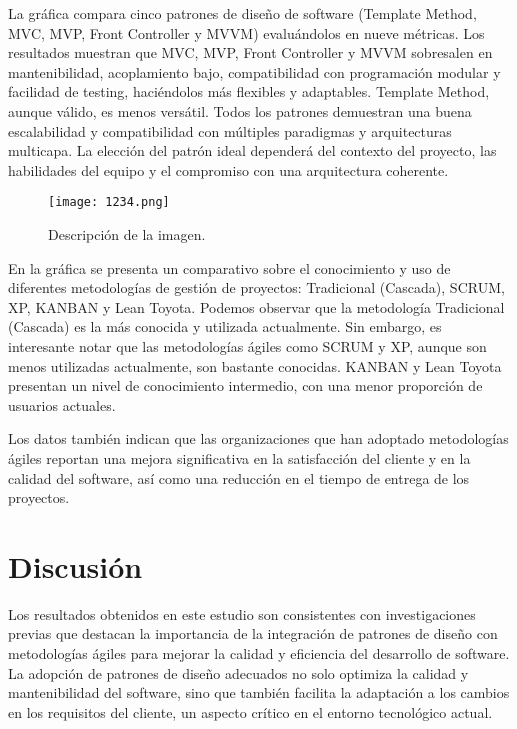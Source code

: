 \documentclass[twocolumn]{article}
\begin{document}
La gráfica compara cinco patrones de diseño de software (Template Method, MVC, MVP, Front Controller y MVVM) evaluándolos en nueve métricas. Los resultados muestran que MVC, MVP, Front Controller y MVVM sobresalen en mantenibilidad, acoplamiento bajo, compatibilidad con programación modular y facilidad de testing, haciéndolos más flexibles y adaptables. Template Method, aunque válido, es menos versátil. Todos los patrones demuestran una buena escalabilidad y compatibilidad con múltiples paradigmas y arquitecturas multicapa. La elección del patrón ideal dependerá del contexto del proyecto, las habilidades del equipo y el compromiso con una arquitectura coherente.

\begin{figure}[h] %
    \centering %
    \texttt{[image: 1234.png]} %
    \caption{Descripción de la imagen.} %
    \label{fig:mi_imagen} %
\end{figure}

En la gráfica se presenta un comparativo sobre el conocimiento y uso de diferentes metodologías de gestión de proyectos: Tradicional (Cascada), SCRUM, XP, KANBAN y Lean Toyota. Podemos observar que la metodología Tradicional (Cascada) es la más conocida y utilizada actualmente. Sin embargo, es interesante notar que las metodologías ágiles como SCRUM y XP, aunque son menos utilizadas actualmente, son bastante conocidas. KANBAN y Lean Toyota presentan un nivel de conocimiento intermedio, con una menor proporción de usuarios actuales.

Los datos también indican que las organizaciones que han adoptado metodologías ágiles reportan una mejora significativa en la satisfacción del cliente y en la calidad del software, así como una reducción en el tiempo de entrega de los proyectos.

\section{Discusión}
Los resultados obtenidos en este estudio son consistentes con investigaciones previas que destacan la importancia de la integración de patrones de diseño con metodologías ágiles para mejorar la calidad y eficiencia del desarrollo de software. La adopción de patrones de diseño adecuados no solo optimiza la calidad y mantenibilidad del software, sino que también facilita la adaptación a los cambios en los requisitos del cliente, un aspecto crítico en el entorno tecnológico actual.
\end{document}
